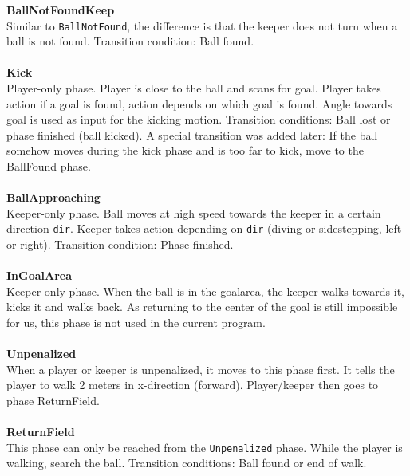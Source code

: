 \documentclass[11pt,a4paper,oneside]{article}
\begin{document}
\textbf{BallNotFoundKeep}\\
Similar to \texttt{BallNotFound}, the difference is that the keeper does not turn when a ball is not found. Transition condition: Ball found.\\\\
\textbf{Kick}\\
Player-only phase. Player is close to the ball and scans for goal. Player takes action if a goal is found, action depends on which goal is found. Angle towards goal is used as input for the kicking motion. Transition conditions: Ball lost or phase finished (ball kicked). A special transition was added later: If the ball somehow moves during the kick phase and is too far to kick, move to the BallFound phase.\\\\
\textbf{BallApproaching}\\
Keeper-only phase. Ball moves at high speed towards the keeper in a certain direction \texttt{dir}. Keeper takes action depending on \texttt{dir} (diving or sidestepping, left or right). Transition condition: Phase finished. \\\\
\textbf{InGoalArea}\\
Keeper-only phase. When the ball is in the goalarea, the keeper walks towards it, kicks it and walks back. As returning to the center of the goal is still impossible for us, this phase is not used in the current program.\\\\
\textbf{Unpenalized}\\
When a player or keeper is unpenalized, it moves to this phase first. It tells the player to walk 2 meters in x-direction (forward). Player/keeper then goes to phase ReturnField.\\\\
\textbf{ReturnField}\\
This phase can only be reached from the \texttt{Unpenalized} phase. While the player is walking, search the ball. Transition conditions: Ball found or end of walk.\\
\end{document}
